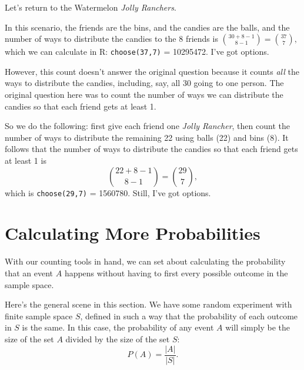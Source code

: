 \documentclass[
]{book}
\theoremstyle{definition}
\theoremstyle{definition}
\theoremstyle{definition}
\theoremstyle{definition}
\theoremstyle{remark}
\begin{document}
Let's return to the Watermelon \emph{Jolly Ranchers}.

In this scenario, the friends are the bins, and the candies are the balls, and the number of ways to distribute the candies to the 8 friends is \(\displaystyle \binom{30+8-1}{8-1}=\binom{37}{7},\)
which we can calculate in R: \texttt{choose(37,7)} = 10295472. I've got options.

However, this count doesn't answer the original question because it counts \emph{all} the ways to distribute the candies, including, say, all 30 going to one person. The original question here was to count the number of ways we can distribute the candies so that each friend gets at least 1.

So we do the following: first give each friend one \emph{Jolly Rancher}, then count the number of ways to distribute the remaining 22 using balls (22) and bins (8). It follows that the number of ways to distribute the candies so that each friend gets at least 1 is
\[\binom{22+8-1}{8-1} = \binom{29}{7},\]
which is \texttt{choose(29,7)} = 1560780. Still, I've got options.

\section{Calculating More Probabilities}\label{prob-with-counting-tools}

With our counting tools in hand, we can set about calculating the probability that an event \(A\) happens without having to first every possible outcome in the sample space.

Here's the general scene in this section. We have some random experiment with finite sample space \(S\), defined in such a way that the probability of each outcome in \(S\) is the same. In this case, the probability of any event \(A\) will simply be the size of the set \(A\) divided by the size of the set \(S\):
\[P(A) = \frac{|A|}{|S|}.\]
\end{document}
